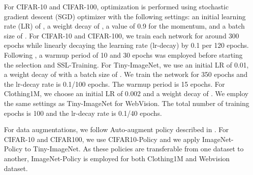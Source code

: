 \documentclass[10pt,twocolumn,letterpaper]{article}
\begin{document}
For CIFAR-10 and CIFAR-100, optimization is performed using stochastic gradient descent (SGD) optimizer with the following settings:  an initial learning rate (LR) of , a weight decay of , a value of 0.9 for the momentum, and a batch size of . For CIFAR-10 and CIFAR-100, we train each network for around 300 epochs while linearly decaying the learning rate (lr-decay) by 0.1 per 120 epochs. Following \cite{li2020dividemix}, a warmup period of 10 and 30 epochs was employed before starting the selection and SSL-Training. 
For Tiny-ImageNet, we use an initial LR of 0.01, a weight decay of  with a batch size of . We train the network for 350 epochs and the lr-decay rate is 0.1/100 epochs. The warmup period is 15 epochs. 
For Clothing1M, we choose an initial LR of 0.002 and a weight decay of . We employ the same settings as Tiny-ImageNet for WebVision. The total number of training epochs is 100 and the lr-decay rate is 0.1/40 epochs. 

For data augmentations, we follow Auto-augment policy described in \cite{cubuk2019autoaugment}. For CIFAR-10 and CIFAR100, we use CIFAR10-Policy and we apply ImageNet-Policy to Tiny-ImageNet. As these policies are transferable from one dataset to another, ImageNet-Policy is employed for both Clothing1M and Webvision dataset.
\end{document}
